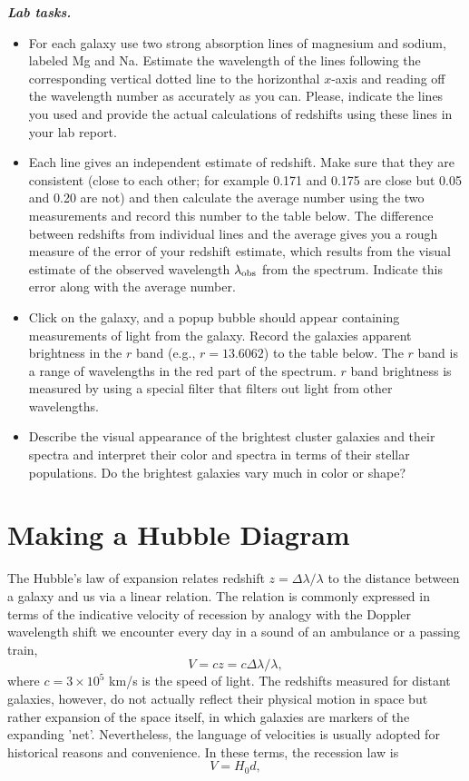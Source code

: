 \documentclass[12pt]{article}
\begin{document}
{\it 
{\bf Lab tasks.}
\begin{itemize}
\item For each galaxy use two strong absorption lines of magnesium and sodium, labeled Mg and Na. 
Estimate the wavelength of the lines
following the corresponding vertical dotted line to the horizonthal $x$-axis 
and reading off the wavelength number as accurately as you can. 
Please, indicate the lines you used
and provide the actual calculations of redshifts using these lines in your 
lab report. 

\item Each line gives an independent estimate of redshift. Make
sure that they are consistent (close to each other; for example 0.171 and 0.175 are
close but 0.05 and 0.20 are not) and then calculate the average number using 
the two measurements and record this number to the table below.
 The difference between redshifts from individual lines
and the average gives you a rough measure of the error of your redshift 
estimate, which results from the visual estimate of the observed wavelength
$\lambda_{\rm obs}$ from the spectrum. Indicate this error along with the average number. 

\item Click on the galaxy, and a popup bubble should appear containing measurements of light from the galaxy.
 Record the galaxies apparent brightness in the $r$ band (e.g., $r=13.6062$) to the table below. 
The $r$ band is a range of wavelengths in the red part of the spectrum. $r$ band brightness is measured by using
a special filter that filters out light from other wavelengths.

\item Describe the visual appearance of the brightest cluster galaxies and their spectra
and interpret their color and spectra in terms of their stellar populations. 
Do the brightest galaxies vary much in color or shape?
\end{itemize}
}

\section{Making a Hubble Diagram}

The Hubble's law of expansion relates redshift $z=\Delta\lambda/\lambda$ to the distance
between a galaxy and us via a linear relation. The relation is commonly
expressed in terms of the indicative velocity of recession by analogy with the Doppler wavelength
shift we encounter every day in a sound of an ambulance or a passing train,
\begin{equation}
V=cz=c\Delta\lambda/\lambda,
\label{eq:redshift}
\end{equation}
where $c=3\times 10^5$ km/s is the speed of light. The redshifts measured 
for distant galaxies, however, do not actually reflect their physical motion 
in space but rather expansion of the space itself, in which galaxies are markers of the expanding 'net'. 
Nevertheless, the language of velocities is usually adopted for historical reasons and convenience. In these
terms, the recession law is
\begin{equation}
V=H_0d,
\label{eq:hubble}
\end{equation}
\end{document}

